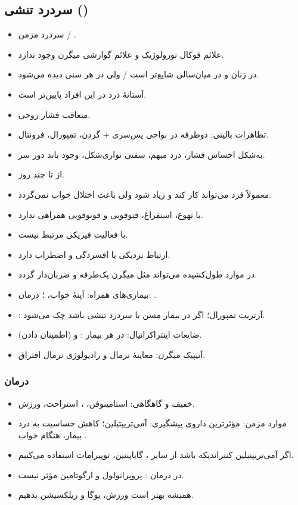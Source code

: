 \subsection{سردرد تنشی ()}
\begin{itemize}
\item سردرد مزمن / .
\item علائم فوکال نورولوژیک و علائم گوارشی میگرن وجود ندارد.
\item در زنان و در میان‌سالی شایع‌تر است / ولی در هر سنی دیده می‌شود.
\item آستانهٔ درد در این افراد پایین‌تر است.
\item متعاقب فشار روحی.
\item تظاهرات بالینی: دوطرفه در نواحی پس‌سری + گردن، تمپورال، فرونتال.
\item به‌شکل احساس فشار، درد مبهم، سفتی نواری‌شکل، وجود باند دور سر.
\item از  تا چند روز.
\item معمولاً فرد می‌تواند کار کند و زیاد شود ولی باعث اختلال خواب نمی‌گردد.
\item با تهوع، استفراغ، فتوفوبی و فونوفوبی همراهی ندارد.
\item با فعالیت فیزیکی مرتبط نیست.
\item ارتباط نزدیکی با افسردگی و اضطراب دارد.
\item در موارد طول‌کشیده می‌تواند مثل میگرن یک‌طرفه و ضربان‌دار گردد.
\item بیماری‌های همراه: آپنهٔ خواب، ؛ درمان: .
\item {}: آرتریت تمپورال؛ اگر در بیمار مسن با سردرد تنشی باشد  چک می‌شود.
\item ضایعات اینتراکرانیال: در هر بیمار :  و  (اطمینان دادن).
\item آتیپیک میگرن: معاینهٔ نرمال و رادیولوژی نرمال افتراق.
\end{itemize}
\subsubsection{درمان}
\begin{itemize}
\item خفیف و گاهگاهی: استامینوفن، ، استراحت، ورزش.
\item موارد مزمن: مؤثرترین داروی پیشگیری: آمی‌تریپتیلین؛ کاهش حساسیت به درد بیمار، هنگام خواب .
\item اگر آمی‌تریپتیلین کنتراندیکه باشد از سایر ، گاباپنتین، توپیرامات استفاده می‌کنیم.
\item در درمان : پروپرانولول و ارگوتامین مؤثر نیست.
\item همیشه بهتر است ورزش، یوگا و ریلکسیشن بدهیم.
\end{itemize}

